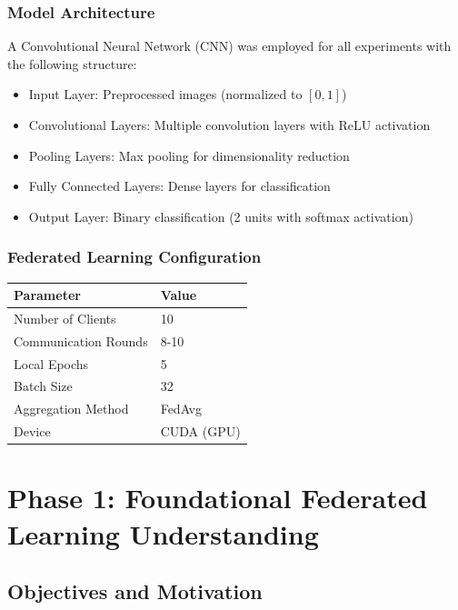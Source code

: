 \documentclass[11pt,a4paper]{report}
\begin{document}
\subsection{Model Architecture}

A Convolutional Neural Network (CNN) was employed for all experiments with the following structure:

\begin{itemize}
    \item Input Layer: Preprocessed images (normalized to $[0,1]$)
    \item Convolutional Layers: Multiple convolution layers with ReLU activation
    \item Pooling Layers: Max pooling for dimensionality reduction
    \item Fully Connected Layers: Dense layers for classification
    \item Output Layer: Binary classification (2 units with softmax activation)
\end{itemize}

\subsection{Federated Learning Configuration}

\begin{table}[h]
\centering
\begin{tabular}{ll}
\toprule
\textbf{Parameter} & \textbf{Value} \\
\midrule
Number of Clients & 10 \\
Communication Rounds & 8-10 \\
Local Epochs & 5 \\
Batch Size & 32 \\
Aggregation Method & FedAvg \\
Device & CUDA (GPU) \\
\bottomrule
\end{tabular}
\end{table}

\chapter{Phase 1: Foundational Federated Learning Understanding}

\section{Objectives and Motivation}
\end{document}

